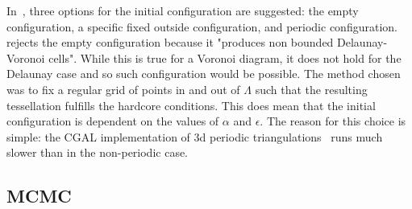\documentclass[12pt,a4paper]{report}
\begin{document}
In~\cite{DL10}, three options for the initial configuration are suggested: the empty configuration, a specific fixed outside configuration, and periodic configuration.~\cite{DL10} rejects the empty configuration because it "produces non bounded Delaunay-Voronoi cells". While this is true for a Voronoi diagram, it does not hold for the Delaunay case and so such configuration would be possible. 
The method chosen was to fix a regular grid of points in and out of $\Lambda$ such that the resulting tessellation fulfills the hardcore conditions. This does mean that the initial configuration is dependent on the values of $\alpha$ and $\epsilon$. The reason for this choice is simple: the CGAL implementation of 3d periodic triangulations~\cite{cgal:3d-period}  runs much slower than in the non-periodic case.


\subsection{MCMC}
\end{document}
